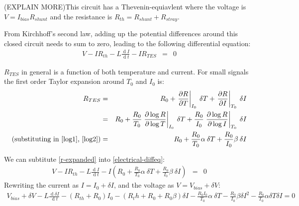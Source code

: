 \documentclass[letterpaper,10pt]{article}
\begin{document}
(EXPLAIN MORE)This circuit has a Thevenin-equiavlent where the voltage is $V = I_{bias} R_{shunt}$ and the resistance is $R_{th} = R_{shunt} + R_{stray}$.

From Kirchhoff's second law, adding up the potential differences around this closed circuit needs to sum to zero, leading to the following differential equation:
\begin{eqnarray}
	V - I R_{th} - L \frac{\operatorname{d} I}{\operatorname{d} t} - I R_{TES} &=& 0 \label{electrical-diffeq}
\end{eqnarray}

$R_{TES}$ in general is a function of both temperature and current. For small signals the first order Taylor expansion around $T_0$ and $I_0$ is:
\begin{eqnarray}
	R_{TES} &=& R_0 + \left.\frac{\partial R}{\partial T}\right|_{I_0} \: \delta T + \left.\frac{\partial R}{\partial I}\right|_{T_0} \: \delta I \\
	&=& R_0 + \frac{R_0}{T_0}\left.\frac{\partial \log R}{\partial \log T}\right|_{I_0} \: \delta T + \frac{R_0}{I_0}\left.\frac{\partial \log R}{\partial \log I}\right|_{T_0} \: \delta I \\
	\mbox{(substituting in \eqref{log1}, \eqref{log2})}&=& R_0 + \frac{R_0}{T_0}\alpha \: \delta T + \frac{R_0}{I_0}\beta \: \delta I \label{r-expanded}
\end{eqnarray}

We can subtitute \eqref{r-expanded} into \eqref{electrical-diffeq}:
\begin{eqnarray}
	V - I R_{th} - L \frac{\operatorname{d} I}{\operatorname{d} t} - I \left(R_0 + \frac{R_0}{T_0}\alpha \: \delta T + \frac{R_0}{I_0}\beta \: \delta I\right) &=& 0
\end{eqnarray}
Rewriting the current as $I = I_0 + \delta I$, and the voltage as $V = V_{bias} + \delta V$:
\begin{eqnarray}
	V_{bias} + \delta V - L \frac{\operatorname{d} \delta I}{\operatorname{d} t} - ( R_{th} + R_0 ) I_0 - \left(R_th + R_0 + R_0 \beta \right) \delta I - \frac{R_0 I_0}{T_0}\alpha \: \delta T - \frac{R_0}{I_0}\beta  {\delta I}^2 - \frac{R_0}{T_0}\alpha {\delta T}{\delta I} = 0
\end{eqnarray}
\end{document}
